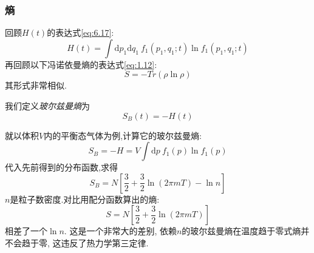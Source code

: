 \subsubsection*{熵} 
    回顾$H(t)$的表达式\eqref{eq:6.17}:
    \[H(t)=\int \mathrm{d} p_1 \mathrm{d} q_1 ~f_{1}(p_1,q_1;t)\ln f_1(p_1,q_1;t)\]
    再回顾以下冯诺依曼熵的表达式\eqref{eq:1.12}:
    \[S=-Tr(\rho \ln \rho)\]
    其形式非常相似.

    我们定义\emph{玻尔兹曼熵}为 
    \begin{equation}
      S_{B}(t)=-H(t)
    \end{equation}
    
    就以体积$V$内的平衡态气体为例,计算它的玻尔兹曼熵:
    \[S_{B}=-H=V \int \mathrm{d}  p ~f_1(p) \ln f_1(p)\]
    代入先前得到的分布函数,求得
    \[S_{B}=N\left[ \frac{3}{2}+\frac{3}{2} \ln(2\pi m T)-\ln n \right] \]
    $n$是粒子数密度.对比用配分函数算出的熵:
    \[S=N\left[ \frac{3}{2}+\frac{3}{2} \ln(2\pi m T)\right]\]
    相差了一个$\ln n$. 这是一个非常大的差别, 依赖$n$的玻尔兹曼熵在温度趋于零式熵并不会趋于零, 这违反了热力学第三定律.
